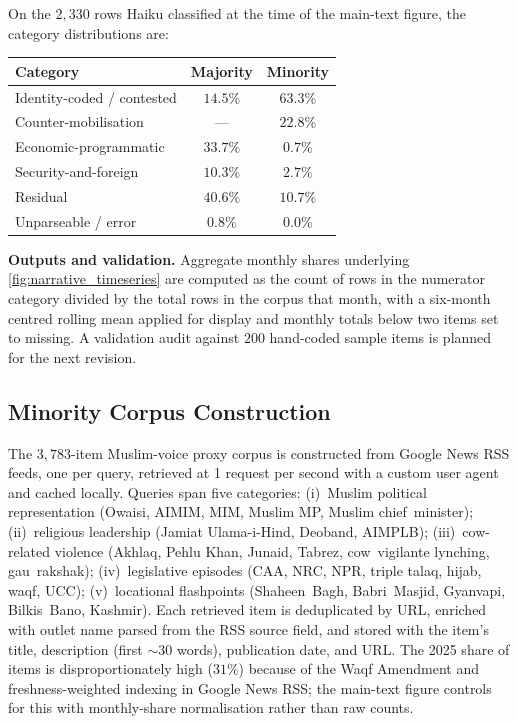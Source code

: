 \documentclass[11pt,twoside]{extarticle}
\begin{document}
On the $2{,}330$ rows Haiku classified at the time of the main-text figure,
the category distributions are:
\begin{center}
\footnotesize
\begin{tabular}{lcc}
\toprule
Category & Majority & Minority \\
\midrule
Identity-coded / contested & $14.5\%$ & $63.3\%$ \\
Counter-mobilisation & --- & $22.8\%$ \\
Economic-programmatic & $33.7\%$ & $0.7\%$ \\
Security-and-foreign & $10.3\%$ & $2.7\%$ \\
Residual & $40.6\%$ & $10.7\%$ \\
Unparseable / error & $0.8\%$ & $0.0\%$ \\
\bottomrule
\end{tabular}
\end{center}

\textbf{Outputs and validation.} Aggregate monthly shares
underlying \autoref{fig:narrative_timeseries} are computed as the count of
rows in the numerator category divided by the total rows in the corpus that
month, with a six-month centred rolling mean applied for display and
monthly totals below two items set to missing. A validation audit against
$200$ hand-coded sample items is planned for the next revision.

\subsection{Minority Corpus Construction} \label{app:minority_corpus}

The $3{,}783$-item Muslim-voice proxy corpus is constructed from Google News
RSS feeds, one per query, retrieved at 1 request per second with a custom
user agent and cached locally. Queries span five categories: (i)~Muslim
political representation (Owaisi, AIMIM, MIM, Muslim MP, Muslim
chief~minister); (ii)~religious leadership (Jamiat Ulama-i-Hind, Deoband,
AIMPLB); (iii)~cow-related violence (Akhlaq, Pehlu Khan, Junaid, Tabrez,
cow~vigilante lynching, gau~rakshak); (iv)~legislative episodes (CAA,
NRC, NPR, triple talaq, hijab, waqf, UCC); (v)~locational flashpoints
(Shaheen~Bagh, Babri~Masjid, Gyanvapi, Bilkis~Bano, Kashmir). Each retrieved
item is deduplicated by URL, enriched with outlet name parsed from the RSS
source field, and stored with the item's title, description (first $\sim$30
words), publication date, and URL. The 2025 share of items is
disproportionately high ($31\%$) because of the Waqf Amendment and
freshness-weighted indexing in Google News RSS; the main-text figure
controls for this with monthly-share normalisation rather than raw counts.
\end{document}
